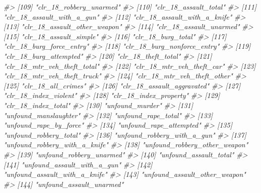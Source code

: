 \documentclass[
  12pt,
  openany]{book}
\newenvironment{Shaded}{\begin{snugshade}}{\end{snugshade}}
\newcommand{\CommentTok}[1]{\textcolor[rgb]{0.37,0.37,0.37}{\textit{#1}}}
\begin{document}
\begin{Shaded}
\begin{Highlighting}[]
\CommentTok{\#\textgreater{} [109] "clr\_18\_robbery\_unarmed"        }
\CommentTok{\#\textgreater{} [110] "clr\_18\_assault\_total"          }
\CommentTok{\#\textgreater{} [111] "clr\_18\_assault\_with\_a\_gun"     }
\CommentTok{\#\textgreater{} [112] "clr\_18\_assault\_with\_a\_knife"   }
\CommentTok{\#\textgreater{} [113] "clr\_18\_assault\_other\_weapon"   }
\CommentTok{\#\textgreater{} [114] "clr\_18\_assault\_unarmed"        }
\CommentTok{\#\textgreater{} [115] "clr\_18\_assault\_simple"         }
\CommentTok{\#\textgreater{} [116] "clr\_18\_burg\_total"             }
\CommentTok{\#\textgreater{} [117] "clr\_18\_burg\_force\_entry"       }
\CommentTok{\#\textgreater{} [118] "clr\_18\_burg\_nonforce\_entry"    }
\CommentTok{\#\textgreater{} [119] "clr\_18\_burg\_attempted"         }
\CommentTok{\#\textgreater{} [120] "clr\_18\_theft\_total"            }
\CommentTok{\#\textgreater{} [121] "clr\_18\_mtr\_veh\_theft\_total"    }
\CommentTok{\#\textgreater{} [122] "clr\_18\_mtr\_veh\_theft\_car"      }
\CommentTok{\#\textgreater{} [123] "clr\_18\_mtr\_veh\_theft\_truck"    }
\CommentTok{\#\textgreater{} [124] "clr\_18\_mtr\_veh\_theft\_other"    }
\CommentTok{\#\textgreater{} [125] "clr\_18\_all\_crimes"             }
\CommentTok{\#\textgreater{} [126] "clr\_18\_assault\_aggravated"     }
\CommentTok{\#\textgreater{} [127] "clr\_18\_index\_violent"          }
\CommentTok{\#\textgreater{} [128] "clr\_18\_index\_property"         }
\CommentTok{\#\textgreater{} [129] "clr\_18\_index\_total"            }
\CommentTok{\#\textgreater{} [130] "unfound\_murder"                }
\CommentTok{\#\textgreater{} [131] "unfound\_manslaughter"          }
\CommentTok{\#\textgreater{} [132] "unfound\_rape\_total"            }
\CommentTok{\#\textgreater{} [133] "unfound\_rape\_by\_force"         }
\CommentTok{\#\textgreater{} [134] "unfound\_rape\_attempted"        }
\CommentTok{\#\textgreater{} [135] "unfound\_robbery\_total"         }
\CommentTok{\#\textgreater{} [136] "unfound\_robbery\_with\_a\_gun"    }
\CommentTok{\#\textgreater{} [137] "unfound\_robbery\_with\_a\_knife"  }
\CommentTok{\#\textgreater{} [138] "unfound\_robbery\_other\_weapon"  }
\CommentTok{\#\textgreater{} [139] "unfound\_robbery\_unarmed"       }
\CommentTok{\#\textgreater{} [140] "unfound\_assault\_total"         }
\CommentTok{\#\textgreater{} [141] "unfound\_assault\_with\_a\_gun"    }
\CommentTok{\#\textgreater{} [142] "unfound\_assault\_with\_a\_knife"  }
\CommentTok{\#\textgreater{} [143] "unfound\_assault\_other\_weapon"  }
\CommentTok{\#\textgreater{} [144] "unfound\_assault\_unarmed"       }

\end{Highlighting}
\end{Shaded}
\end{document}
